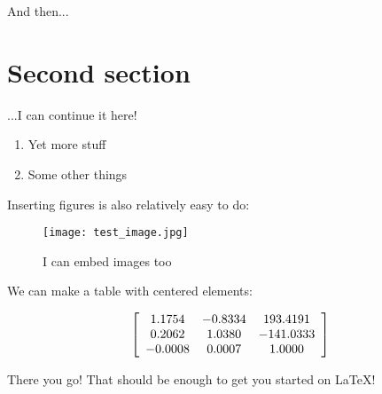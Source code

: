 \documentclass[a4paper,12pt]{article} %
\begin{document}
\noindent
And then...

\section{Second section}

...I can continue it here!

\vspace{5mm}
\begin{enumerate}[resume]
\item Yet more stuff
\item Some other things
\end{enumerate}
\vspace{5mm}

Inserting figures is also relatively easy to do: 

\vspace{5mm}
\begin{figure}[!ht]
  \centering
  \texttt{[image: test\_image.jpg]}
  \caption{I can embed images too}
\end{figure}

\noindent
We can make a table with centered elements:

\vspace{5mm}
\[ \left[ \begin{array}{c c c}
1.1754 & -0.8334 & 193.4191\\
0.2062 & 1.0380 & -141.0333\\
-0.0008 & 0.0007 & 1.0000\\
\end{array}
\right] \]
\vspace{5mm}

\noindent
There you go! That should be enough to get you started on \LaTeX!

\lstlistoflistings
\end{document}

